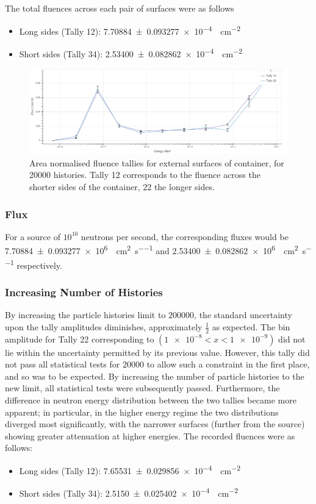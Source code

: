 \documentclass{article}
\begin{document}
    The total fluences across each pair of surfaces were as follows
    \begin{itemize}
      \item Long sides (Tally 12): \SI{7.70884\pm0.093277e-4}{\neutron\per\cm^2}
      \item Short sides (Tally 34): \SI{2.53400 \pm 0.082862e-4}{\neutron\per\cm^2}
    \end{itemize}
    \begin{figure}[htb]
      \includegraphics[width=\textwidth]{tallies_norm.png}
      \caption{Area normalised fluence tallies for external surfaces of container, for \num{20000} histories. Tally 12 corresponds to the fluence across the shorter sides of the container, 22 the longer sides.}
      \label{fig:tallies_20000_norm}
    \end{figure}

    \subsubsection{Flux}
    For a source of $10^{10}$ neutrons per second, the corresponding fluxes would be \SI{7.70884\pm 0.093277e+6}{\neutron\per\cm^2\per\second} and \SI{2.53400 \pm 0.082862e+6}{\neutron\per\cm^2\per\second} respectively.

    \subsubsection{Increasing Number of Histories}
      By increasing the particle histories limit to $200000$, the standard uncertainty upon the tally amplitudes diminishes, approximately $\frac{1}{2}$ as expected. The bin amplitude for Tally 22 corresponding to $(\num{1e-8} < x <\num{1e-9})$ did not lie within the uncertainty permitted by its previous value. However, this tally did not pass all statistical tests for $20000$ to allow such a constraint in the first place, and so was to be expected. By increasing the number of particle histories to the new limit, all statistical tests were subsequently passed. Furthermore, the difference in neutron energy distribution between the two tallies became more apparent; in particular, in the higher energy regime the two distributions diverged most significantly, with the narrower surfaces (further from the source) showing greater attenuation at higher energies.
      The recorded fluences were as follows:
      \begin{itemize}
          \item Long sides (Tally 12): \SI{7.65531\pm 0.029856e-4}{\neutron\per\cm^2}
          \item Short sides (Tally 34): \SI{2.5150\pm 0.025402e-4}{\neutron\per\cm^2}
      \end{itemize}
\end{document}

